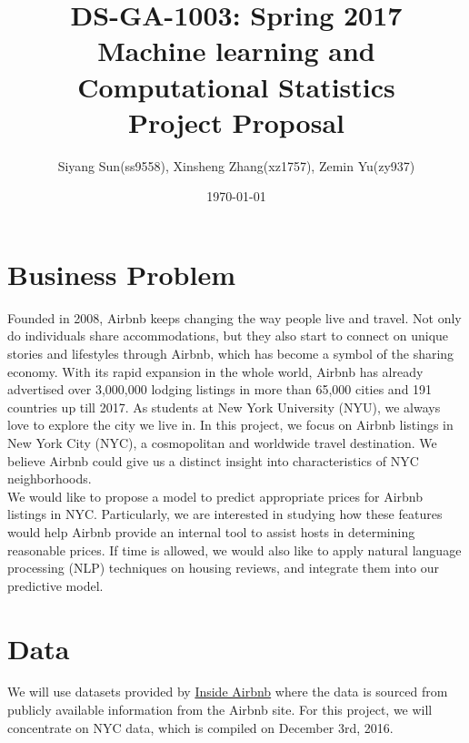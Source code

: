 \documentclass{article}
\begin{document}
	
	\pagestyle{fancy}
	\fancyhf{}
	
	\title{DS-GA-1003: Spring 2017 \\ 
		Machine learning and Computational Statistics \\ 
		Project Proposal}
	\date{\today}
	\author{Siyang Sun(ss9558), Xinsheng Zhang(xz1757), Zemin Yu(zy937)}
	\maketitle
	\section{Business Problem}
	\noindent Founded in 2008, Airbnb keeps changing the way people live and travel. Not only do individuals share accommodations, but they also start to connect on unique stories and lifestyles through Airbnb, which has become a symbol of the sharing economy. With its rapid expansion in the whole world, Airbnb has already advertised over 3,000,000 lodging listings in more than 65,000 cities and 191 countries up till 2017. As students at New York University (NYU), we always love to explore the city we live in. In this project, we focus on Airbnb listings in New York City (NYC), a cosmopolitan and worldwide travel destination. We believe Airbnb could give us a distinct insight into characteristics of NYC neighborhoods.\\
	
	 \noindent We would like to propose a model to predict appropriate prices for Airbnb listings in NYC. Particularly, we are interested in studying how these features would help Airbnb provide an internal tool to assist hosts in determining reasonable prices. If time is allowed, we would also like to apply natural language processing (NLP) techniques on housing reviews, and integrate them into our predictive model.
	
	\section{Data}
	We will use datasets provided by \href{http://insideairbnb.com/get-the-data.html}{Inside Airbnb} where the data is sourced from publicly available information from the Airbnb site. For this project, we will concentrate on NYC data, which is compiled on December 3rd, 2016.\\
	
\end{document}
